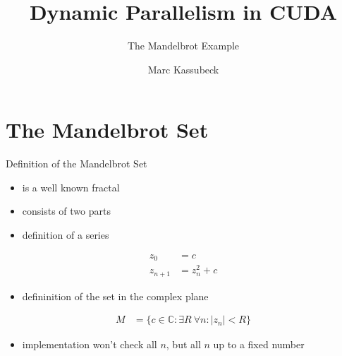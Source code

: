 \documentclass[fleqn,11pt,aspectratio=43]{beamer}
\title{Dynamic Parallelism in CUDA}
\subtitle{The Mandelbrot Example}
\author{Marc Kassubeck}
\begin{document}

\begin{frame}[plain]
\titlepage
\end{frame}

\begin{frame}[plain]
  \tableofcontents
\end{frame}


\section{The Mandelbrot Set}

\begin{frame}{Definition of the Mandelbrot Set}
	\begin{itemize}
		\item is a well known fractal
		\item consists of two parts
		\item definition of a series
	\end{itemize}	
	\begin{align*}
		z_0 &= c\\
		z_{n+1} &= z_n^2 + c
	\end{align*}
	\begin{itemize}
		\item defininition of the set in the complex plane
	\end{itemize}
	\begin{align*}
		M &= \{c \in \mathbb{C}: \exists R\ \forall n: \left| z_n \right| < R \}
	\end{align*}
	\begin{itemize}
		\item implementation won't check all $n$, but all $n$ up to a fixed number
	\end{itemize}
\end{frame}
\end{document}
